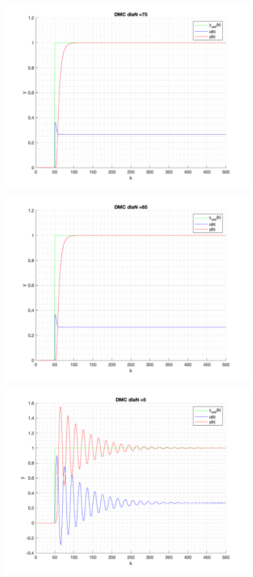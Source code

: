 \documentclass[a4paper, 11pt]{article}
\begin{document}
\begin{enumerate}
 \includegraphics[width=\linewidth]{./ModelsP4_N/P4_DMC_N_75_png.png} 
 
 \includegraphics[width=\linewidth]{./ModelsP4_N/P4_DMC_N_65_png.png} 
 
 \includegraphics[width=\linewidth]{./ModelsP4_N/P4_DMC_N_5_png.png} 
 

\end{enumerate}
\end{document}
